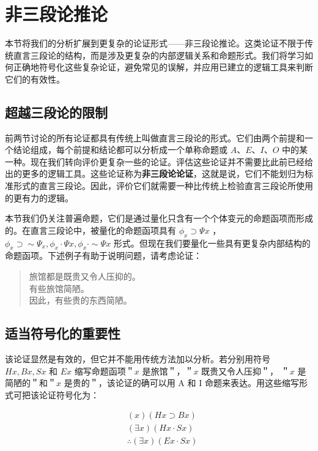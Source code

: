 \section{非三段论推论}

\begin{logicbox}[title=引言]
本节将我们的分析扩展到更复杂的论证形式——非三段论推论。这类论证不限于传统直言三段论的结构，而是涉及更复杂的内部逻辑关系和命题形式。我们将学习如何正确地符号化这些复杂论证，避免常见的误解，并应用已建立的逻辑工具来判断它们的有效性。
\end{logicbox}

\subsection{超越三段论的限制}

前两节讨论的所有论证都具有传统上叫做直言三段论的形式。它们由两个前提和一个结论组成，每个前提和结论都可以分析成一个单称命题或 $A 、 E 、 I 、 O$ 中的某一种。现在我们转向评价更复杂一些的论证。评估这些论证并不需要比此前已经给出的更多的逻辑工具。这些论证称为\textbf{非三段论论证}，这就是说，它们不能划归为标准形式的直言三段论。因此，评价它们就需要一种比传统上检验直言三段论所使用的更有力的逻辑。

本节我们仍关注普遍命题，它们是通过量化只含有一个个体变元的命题函项而形成的。在直言三段论中，被量化的命题函项具有 $\phi_{x} \supset \Psi x$ ， $\phi_{x} \supset \sim \Psi_{x}, \phi_{x} \cdot \Psi x, \phi_{x} \cdot \sim \Psi x$ 形式。但现在我们要量化一些具有更复杂内部结构的命题函项。下述例子有助于说明问题，请考虑论证：

\begin{quote}
旅馆都是既贵又令人压抑的。\\
有些旅馆简陋。\\
因此，有些贵的东西简陋。
\end{quote}

\subsection{适当符号化的重要性}

该论证显然是有效的，但它并不能用传统方法加以分析。若分别用符号 $H x, B x, S x$ 和 $E x$ 缩写命题函项＂$x$ 是旅馆＂，＂$x$ 既贵又令人压抑＂， ＂$x$ 是简陋的＂和＂$x$ 是贵的＂，该论证的确可以用 A 和 I 命题来表达。\cite{lukasiewicz1951}用这些缩写形式可把该论证符号化为：

$$
\begin{aligned}
& (x)(H x \supset B x) \\
& (\exists x)(H x \cdot S x) \\
& \therefore(\exists x)(E x \cdot S x)
\end{aligned}
$$

